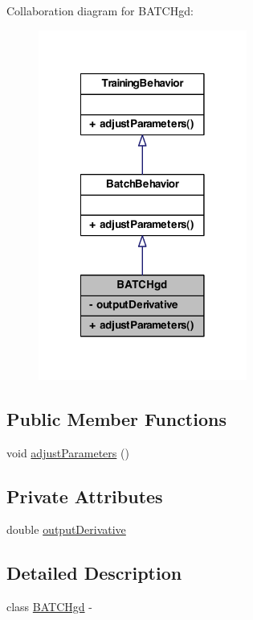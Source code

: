 Collaboration diagram for BATCHgd:\nopagebreak
\begin{figure}[H]
\begin{center}
\leavevmode
\includegraphics[width=194pt]{class_b_a_t_c_hgd__coll__graph}
\end{center}
\end{figure}
\subsection*{Public Member Functions}
\begin{DoxyCompactItemize}
\item 
void \hyperlink{class_b_a_t_c_hgd_af595488bdd12a46087edbdab0385251a}{adjustParameters} ()
\end{DoxyCompactItemize}
\subsection*{Private Attributes}
\begin{DoxyCompactItemize}
\item 
double \hyperlink{class_b_a_t_c_hgd_a4668a2e34a1323212a71c3aaf378a10d}{outputDerivative}
\end{DoxyCompactItemize}


\subsection{Detailed Description}
class \hyperlink{class_b_a_t_c_hgd}{BATCHgd} -\/ 

